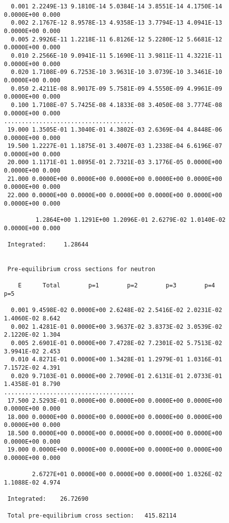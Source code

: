 \begin{samplecase}
{\begin{verbatim}
  0.001 2.2249E-13 9.1810E-14 5.0384E-14 3.8551E-14 4.1750E-14 0.0000E+00 0.000
  0.002 2.1767E-12 8.9578E-13 4.9358E-13 3.7794E-13 4.0941E-13 0.0000E+00 0.000
  0.005 2.9926E-11 1.2218E-11 6.8126E-12 5.2280E-12 5.6681E-12 0.0000E+00 0.000
  0.010 2.2566E-10 9.0941E-11 5.1690E-11 3.9811E-11 4.3221E-11 0.0000E+00 0.000
  0.020 1.7108E-09 6.7253E-10 3.9631E-10 3.0739E-10 3.3461E-10 0.0000E+00 0.000
  0.050 2.4211E-08 8.9017E-09 5.7581E-09 4.5550E-09 4.9961E-09 0.0000E+00 0.000
  0.100 1.7108E-07 5.7425E-08 4.1833E-08 3.4050E-08 3.7774E-08 0.0000E+00 0.000
.....................................
 19.000 1.3505E-01 1.3040E-01 4.3802E-03 2.6369E-04 4.8448E-06 0.0000E+00 0.000
 19.500 1.2227E-01 1.1875E-01 3.4007E-03 1.2338E-04 6.6196E-07 0.0000E+00 0.000
 20.000 1.1171E-01 1.0895E-01 2.7321E-03 3.1776E-05 0.0000E+00 0.0000E+00 0.000
 21.000 0.0000E+00 0.0000E+00 0.0000E+00 0.0000E+00 0.0000E+00 0.0000E+00 0.000
 22.000 0.0000E+00 0.0000E+00 0.0000E+00 0.0000E+00 0.0000E+00 0.0000E+00 0.000

         1.2864E+00 1.1291E+00 1.2096E-01 2.6279E-02 1.0140E-02 0.0000E+00 0.000

 Integrated:     1.28644


 Pre-equilibrium cross sections for neutron

    E      Total        p=1        p=2        p=3        p=4        p=5        

  0.001 9.4598E-02 0.0000E+00 2.6248E-02 2.5416E-02 2.0231E-02 1.4060E-02 8.642
  0.002 1.4281E-01 0.0000E+00 3.9637E-02 3.8373E-02 3.0539E-02 2.1220E-02 1.304
  0.005 2.6901E-01 0.0000E+00 7.4728E-02 7.2301E-02 5.7513E-02 3.9941E-02 2.453
  0.010 4.8271E-01 0.0000E+00 1.3428E-01 1.2979E-01 1.0316E-01 7.1572E-02 4.391
  0.020 9.7103E-01 0.0000E+00 2.7090E-01 2.6131E-01 2.0733E-01 1.4358E-01 8.790
.....................................
 17.500 2.5293E-01 0.0000E+00 0.0000E+00 0.0000E+00 0.0000E+00 0.0000E+00 0.000
 18.000 0.0000E+00 0.0000E+00 0.0000E+00 0.0000E+00 0.0000E+00 0.0000E+00 0.000
 18.500 0.0000E+00 0.0000E+00 0.0000E+00 0.0000E+00 0.0000E+00 0.0000E+00 0.000
 19.000 0.0000E+00 0.0000E+00 0.0000E+00 0.0000E+00 0.0000E+00 0.0000E+00 0.000

        2.6727E+01 0.0000E+00 0.0000E+00 0.0000E+00 1.0326E-02 1.1088E-02 4.974

 Integrated:    26.72690

 Total pre-equilibrium cross section:   415.82114
\end{verbatim} } \renewcommand{\baselinestretch}{1.07}\small\normalsize
\end{samplecase}

